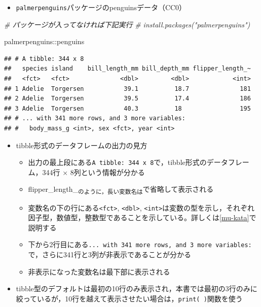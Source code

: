 \documentclass[
  xelatex,ja=standard, b5paper]{bxjsbook}
\newenvironment{Shaded}{\begin{snugshade}}{\end{snugshade}}
\newcommand{\CommentTok}[1]{\textcolor[rgb]{0.56,0.35,0.01}{\textit{#1}}}
\newcommand{\NormalTok}[1]{#1}
\newcommand{\SpecialCharTok}[1]{\textcolor[rgb]{0.00,0.00,0.00}{#1}}
\providecommand{\tightlist}{%
  \setlength{\itemsep}{0pt}\setlength{\parskip}{0pt}}
\begin{document}
\begin{itemize}
\tightlist
\item
  \texttt{palmerpenguins}パッケージのpenguinsデータ（CC0）
\end{itemize}

\begin{Shaded}
\begin{Highlighting}[]
\CommentTok{\# パッケージが入ってなければ下記実行}
\CommentTok{\# install.packages("palmerpenguins")}

\NormalTok{palmerpenguins}\SpecialCharTok{::}\NormalTok{penguins}
\end{Highlighting}
\end{Shaded}

\begin{verbatim}
## # A tibble: 344 x 8
##   species island    bill_length_mm bill_depth_mm flipper_length_~
##   <fct>   <fct>              <dbl>         <dbl>            <int>
## 1 Adelie  Torgersen           39.1          18.7              181
## 2 Adelie  Torgersen           39.5          17.4              186
## 3 Adelie  Torgersen           40.3          18                195
## # ... with 341 more rows, and 3 more variables:
## #   body_mass_g <int>, sex <fct>, year <int>
\end{verbatim}

\begin{itemize}
\tightlist
\item
  tibble形式のデータフレームの出力の見方

  \begin{itemize}
  \tightlist
  \item
    出力の最上段にある\texttt{A\ tibble:\ 344\ x\ 8}で，tibble形式のデータフレーム，344行 × 8列という情報が分かる
  \item
    flipper\_length\_\textsubscript{のように，長い変数名は}で省略して表示される
  \item
    変数名の下の行にある\texttt{\textless{}fct\textgreater{}}, \texttt{\textless{}dbl\textgreater{}}, \texttt{\textless{}int\textgreater{}}は変数の型を示し，それぞれ因子型，数値型，整数型であることを示している。詳しくは\ref{mu-kata}で説明する
  \item
    下から2行目にある\texttt{...\ with\ 341\ more\ rows,\ and\ 3\ more\ variables:}で，さらに341行と3列が非表示であることが分かる
  \item
    非表示になった変数名は最下部に表示される
  \end{itemize}
\item
  tibble型のデフォルトは最初の10行のみ表示され，本書では最初の3行のみに絞っているが，10行を越えて表示させたい場合は，\texttt{print(\ )}関数を使う
\end{itemize}
\end{document}
